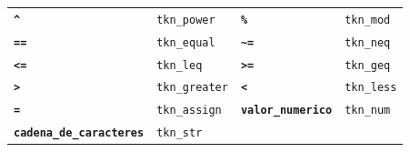 \documentclass[11pt,a4paper]{article}
\newcommand{\tk}[1]{\textbf{\texttt{#1}}}
\begin{document}
\begin{longtable}{@{}l@{\quad}l@{\qquad}l@{\quad}l@{}}
\tk{\textquotesingle{}\textasciicircum{}\textquotesingle{}} & \texttt{tkn\_power} & \tk{\textquotesingle{}\%\textquotesingle{}} & \texttt{tkn\_mod} \\
\tk{\textquotesingle{}==\textquotesingle{}} & \texttt{tkn\_equal} & \tk{\textquotesingle{}\textasciitilde{}=\textquotesingle{}} & \texttt{tkn\_neq} \\
\tk{\textquotesingle{}<=\textquotesingle{}} & \texttt{tkn\_leq} & \tk{\textquotesingle{}>=\textquotesingle{}} & \texttt{tkn\_geq} \\
\tk{\textquotesingle{}>\textquotesingle{}} & \texttt{tkn\_greater} & \tk{\textquotesingle{}<\textquotesingle{}} & \texttt{tkn\_less} \\
\tk{\textquotesingle{}=\textquotesingle{}} & \texttt{tkn\_assign} & \tk{valor\_numerico} & \texttt{tkn\_num} \\
\tk{cadena\_de\_caracteres} & \texttt{tkn\_str} &  &  \\
\end{longtable}
\end{document}
